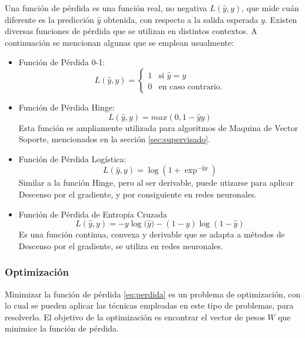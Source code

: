 \documentclass[a4paper,11pt,spanish]{book}
\begin{document}
	  Una función de pérdida es una función real, no negativa $L({\widehat y}, y)$, que mide cuán diferente es la predicción ${\widehat y}$ obtenida, con respecto a la
	  salida esperada $y$. 
	  Existen diversas funciones de pérdida que se utilizan en distintos contextos. A continuación se mencionan algunas que se emplean usualmente:
	  
	  \begin{itemize}
	    \item Función de Pérdida 0-1:
	      \begin{equation*}
		L({\widehat y}, y) =  \begin{cases}
					    1 & \text{si ${\widehat y} = y$} \\
					    0 & \text{en caso contrario.}
		                      \end{cases}
	      \end{equation*}
	    \item Función de Pérdida Hinge:
	      \begin{equation*}
		L({\widehat y}, y) =  max(0, 1 - {\widehat y}y)
	      \end{equation*}
	      Esta función es ampliamente utilizada para algoritmos de Maquina de Vector Soporte, mencionados en la sección \ref{sec:supervisado}.
	    \item Función de Pérdida Logística:
	      \begin{equation*}
		L({\widehat y}, y) =  {\log(1+ {\exp^{-{\widehat y}y}})}
	      \end{equation*}
	      Similar a la función Hinge, pero al ser derivable, puede utizarse para aplicar Descenso por el gradiente, y por consiguiente en redes neuronales.
	    \item Función de Pérdida de Entropía Cruzada
	      \begin{equation} \label{eq:cross_entropy}
		L({\widehat y}, y) = -y{\log({\widehat y}}) - (1-y) {\log(1-{\widehat y})}
	      \end{equation}
	      Es una función continua, convexa y derivable que se adapta a métodos de Descenso por el gradiente, se utiliza en redes neuronales.

	  \end{itemize}

    \subsubsection{Optimización} \label{sec:optimizacion}
      Minimizar la función de pérdida \eqref{eq:perdida} es un problema de optimización, con lo cual se pueden aplicar las técnicas empleadas 
      en este tipo de problemas, para resolverlo.
      El objetivo de la optimización es encontrar el vector de pesos $W$ que minimice la función de pérdida.
      
\end{document}
